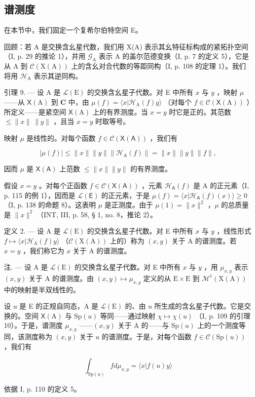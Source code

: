 \subsection{谱测度}

在本节中，我们固定一个复希尔伯特空间 E。

回顾：若 A 是交换含幺星代数，我们用 X(A) 表示其幺特征标构成的紧拓扑空间（I, p. 29 的推论 1），并用 \(\mathcal{G}_{\mathrm{A}}\) 表示 A 的盖尔范德变换（I, p. 7 的定义 5），它是从 A 到 \(\mathcal{C}(\mathrm{X}(\mathrm{A}))\) 上的含幺对合代数的等距同构（I, p. 108 的定理 1）。我们将用 \(\mathcal{H}_{\mathrm{A}}\) 表示其逆同构。

引理 9. --- 设 A 是 \(\mathcal{L}(\mathrm{E})\) 的交换含幺星子代数。对 E 中所有 \(x\) 与 \(y\) ，映射 \(\mu\) ——从 \(\mathsf{X}(\mathrm{A})\) 到 \(\mathbf{C}\) 中，由 \(\mu(f) = \langle x | \mathcal{H}_{\mathrm{A}}(f)y \rangle\) （对每个 \(f \in \mathcal{C}(\mathsf{X}(\mathrm{A}))\) ）所定义——是紧空间 \(\mathsf{X}(\mathrm{A})\) 上的有界测度。当 \(x = y\) 时它是正的。其范数 \(\leqslant \|x\|\ \|y\|\) ，且当 \(x = y\) 时取等号。

映射 \(\mu\) 是线性的。对每个函数 \(f\in\mathcal{C}(\mathsf{X}(\mathsf{A}))\) ，我们有

\[
| \mu (f) | \leqslant \| x \| \| y \| \| \mathcal {H} _ {\mathrm{A}} (f) \| = \| x \| \| y \| \| f \|,
\]

因而 \(\mu\) 是 \(\mathsf{X}(\mathsf{A})\) 上范数 \(\leqslant \| x\|\| y\|\) 的有界测度。

假设 \(x = y\) 。对每个正函数 \(f \in \mathcal{C}(\mathsf{X}(\mathsf{A}))\) ，元素 \(\mathcal{H}_{\mathsf{A}}(f)\) 是 A 的正元素（I, p. 115 的例 1），因而是 \(\mathcal{L}(\mathsf{E})\) 的正元素，于是 \(\mu(f) = \langle x | \mathcal{H}_{\mathsf{A}}(f)(x) \rangle \geqslant 0\) （I, p. 138 的命题 8）。这表明 \(\mu\) 是正测度。由于 \(\mu(1) = \|x\|^2\) ，\(\mu\) 的总质量是 \(\|x\|^2\) （INT, III, p. 58, § 1, no. 8，推论 2）。

定义 2. --- 设 A 是 \(\mathcal{L}(\mathrm{E})\) 的交换含幺星子代数。对 E 中所有 \(x\) 与 \(y\) ，线性形式 \(f \mapsto \langle x | \mathcal{H}_{\mathrm{A}}(f)y \rangle\) （\(\mathcal{C}(\mathrm{X}(\mathrm{A}))\) 上的）称为 \((x,y)\) 关于 A 的谱测度。若 \(x = y\) ，我们称它为 \(x\) 关于 A 的谱测度。

注. --- 设 A 是 \(\mathcal{L}(\mathrm{E})\) 的交换含幺星子代数。对 E 中所有 \(x\) 与 \(y\) ，用 \(\mu_{x,y}\) 表示 \((x,y)\) 关于 A 的谱测度。由 \((x,y) \mapsto \mu_{x,y}\) 定义的从 \(\mathrm{E} \times \mathrm{E}\) 到 \(\mathcal{M}^1(\mathrm{X}(\mathrm{A}))\) 中的映射是半双线性的。

设 \(u\) 是 E 的正规自同态，A 是 \(\mathcal{L}(\mathrm{E})\) 的、由 \(u\) 所生成的含幺星子代数。它是交换的。空间 \(\mathsf{X}(\mathrm{A})\) 与 \(\mathrm{Sp}(u)\) 等同——通过映射 \(\chi \mapsto \chi(u)\) （I, p. 109 的引理 10）。于是，谱测度 \(\mu_{x,y}\) ——\((x,y)\) 关于 A 的——与 \(\mathrm{Sp}(u)\) 上的一个测度等同，该测度称为 \((x,y)\) 关于 \(u\) 的谱测度。于是，对每个函数 \(f \in \mathcal{C}(\mathrm{Sp}(u))\) ，我们有

\[
\int_ {\mathrm{Sp} (u)} f d \mu_ {x, y} = \langle x | f (u) y \rangle
\]

依据 I, p. 110 的定义 5。

